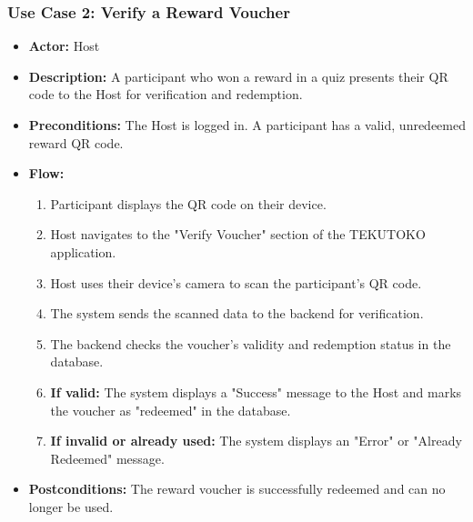 \subsubsection{Use Case 2: Verify a Reward Voucher}
\begin{itemize}
    \item \textbf{Actor:} Host
    \item \textbf{Description:} A participant who won a reward in a quiz presents their QR code to the Host for verification and redemption.
    \item \textbf{Preconditions:} The Host is logged in. A participant has a valid, unredeemed reward QR code.
    \item \textbf{Flow:}
    \begin{enumerate}
        \item Participant displays the QR code on their device.
        \item Host navigates to the "Verify Voucher" section of the TEKUTOKO application.
        \item Host uses their device's camera to scan the participant's QR code.
        \item The system sends the scanned data to the backend for verification.
        \item The backend checks the voucher's validity and redemption status in the database.
        \item \textbf{If valid:} The system displays a "Success" message to the Host and marks the voucher as "redeemed" in the database.
        \item \textbf{If invalid or already used:} The system displays an "Error" or "Already Redeemed" message.
    \end{enumerate}
    \item \textbf{Postconditions:} The reward voucher is successfully redeemed and can no longer be used.
\end{itemize}